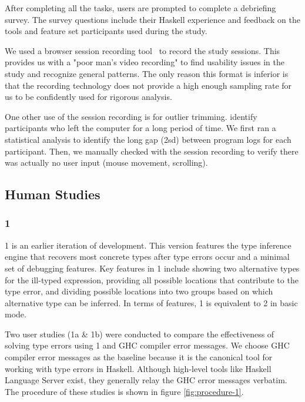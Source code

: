 After completing all the tasks, users are prompted to complete a debriefing survey. The survey questions include their Haskell experience and feedback on the tools and feature set participants used during the study.

We used a browser session recording tool~\cite{openreplay_openreplay_2022} to record the study sessions. This provides us with a "poor man's video recording"  to find usability issues in the study and recognize general patterns. The only reason this format is inferior is that the recording technology does not provide a high enough sampling rate for us to be confidently used for rigorous analysis.

One other use of the session recording is for outlier trimming.   identify participants who left the computer for a long period of time. We first ran a statistical analysis to identify the long gap (2sd) between program logs for each participant. Then, we manually checked with the session recording to verify there was actually no user input (mouse movement, scrolling). 

\subsection{\chameleon{} Human Studies}


\subsubsection{\textbf{\chameleon{} 1}}  
\chameleon{} 1 is an earlier iteration of \chameleon{} development. This version features the type inference engine that recovers most concrete types after type errors occur and a minimal set of debugging features. Key features in \chameleon{} 1 include showing two alternative types for the ill-typed expression,  providing all possible locations that contribute to the type error, and dividing possible locations into two groups based on which alternative type can be inferred. In terms of features, \chameleon{} 1 is equivalent to \chameleon{} 2 in basic mode. 


Two user studies (1a & 1b) were conducted to compare the effectiveness of solving type errors using \chameleon{} 1 and GHC compiler error messages. We choose GHC compiler error messages as the baseline because it is the canonical tool for working with type errors in Haskell. Although high-level tools like Haskell Language Server exist, they generally relay the GHC error messages verbatim. The procedure of these studies is shown in figure \ref{fig:procedure-1}.



